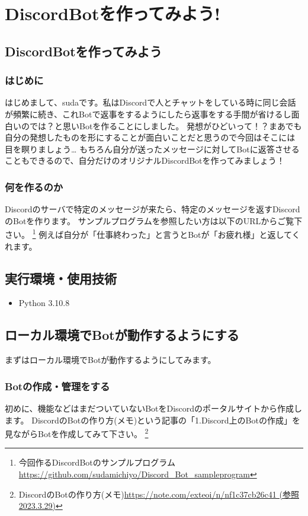 \chapter{DiscordBotを作ってみよう!}

\section{DiscordBotを作ってみよう}
\subsection{はじめに}
はじめまして、sudaです。私はDiscordで人とチャットをしている時に同じ会話が頻繁に続き、これBotで返事をするようにしたら返事をする手間が省けるし面白いのでは？と思いBotを作ることにしました。
発想がひどいって！？まあでも自分の発想したものを形にすることが面白いことだと思うので今回はそこには目を瞑りましょう…
もちろん自分が送ったメッセージに対してBotに返答させることもできるので、自分だけのオリジナルDiscordBotを作ってみましょう！

\subsection{何を作るのか}
Discordのサーバで特定のメッセージが来たら、特定のメッセージを返すDiscordのBotを作ります。
サンプルプログラムを参照したい方は以下のURLからご覧下さい。
\footnote{今回作るDiscordBotのサンプルプログラム\url{https://github.com/sudamichiyo/Discord_Bot_sampleprogram}}
例えば自分が「仕事終わった」と言うとBotが「お疲れ様」と返してくれます。
\section{実行環境・使用技術}
\begin{itemize}
  \item Python 3.10.8
\end{itemize}


\section{ローカル環境でBotが動作するようにする}
まずはローカル環境でBotが動作するようにしてみます。

\subsection{Botの作成・管理をする}
初めに、機能などはまだついていないBotをDiscordのポータルサイトから作成します。
DiscordのBotの作り方(メモ)という記事の「1.Discord上のBotの作成」を見ながらBotを作成してみて下さい。
\footnote{DiscordのBotの作り方(メモ)\url{https://note.com/exteoi/n/nf1c37cb26c41 (参照2023.3.29)}}

